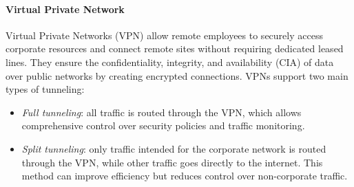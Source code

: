 \paragraph*{Virtual Private Network}
Virtual Private Networks (VPN) allow remote employees to securely access corporate resources and connect remote sites without requiring dedicated leased lines. 
They ensure the confidentiality, integrity, and availability (CIA) of data over public networks by creating encrypted connections. 
VPNs support two main types of tunneling:
\begin{itemize}
    \item \textit{Full tunneling}: all traffic is routed through the VPN, which allows comprehensive control over security policies and traffic monitoring.
    \item \textit{Split tunneling}: only traffic intended for the corporate network is routed through the VPN, while other traffic goes directly to the internet. 
        This method can improve efficiency but reduces control over non-corporate traffic.
\end{itemize}